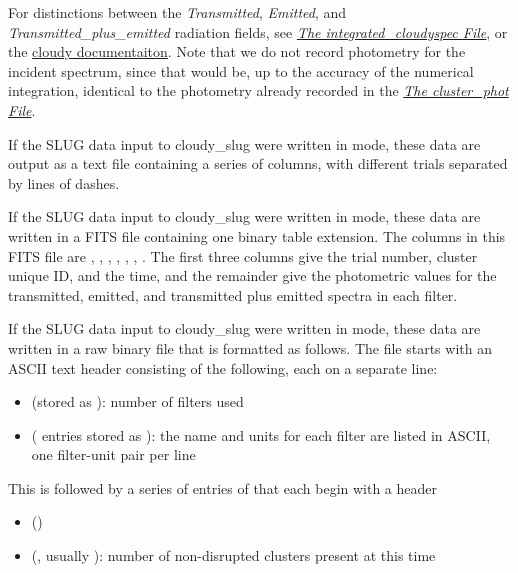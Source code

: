 \documentclass[letterpaper,10pt,english]{sphinxmanual}
\begin{document}
For distinctions between the \emph{Transmitted}, \emph{Emitted}, and
\emph{Transmitted\_plus\_emitted} radiation fields, see
{\hyperref[cloudy:sssec-int-cloudyspec-file]{\emph{The integrated\_cloudyspec File}}}, or the \href{http://nublado.org}{cloudy documentaiton}. Note that we do not record photometry for the
incident spectrum, since that would be, up to the accuracy of the
numerical integration, identical to the photometry already recorded in
the {\hyperref[output:ssec-cluster-phot-file]{\emph{The cluster\_phot File}}}.

If the SLUG data input to cloudy\_slug were written in  mode,
these data are output as a text file containing a series of columns,
with different trials separated by lines of dashes.

If the SLUG data input to cloudy\_slug were written in  mode,
these data are written in a FITS file containing one binary table
extension. The columns in this FITS file are , ,
, , ,
, . The first three columns
give the trial number, cluster unique ID, and the time, and the
remainder give the photometric values for the transmitted, emitted,
and transmitted plus emitted spectra in each filter.

If the SLUG data input to cloudy\_slug were written in  mode,
these data are written in a raw binary file that is formatted as
follows. The file starts with an ASCII text header consisting of the
following, each on a separate line:
\begin{itemize}
\item {} 
 (stored as ): number of filters used

\item {} 
  ( entries stored as ): the name and units for each filter are listed in ASCII, one
filter-unit pair per line

\end{itemize}

This is followed by a series of entries of that each begin with a
header
\begin{itemize}
\item {} 
 ()

\item {} 
 (, usually ): number of non-disrupted clusters present at this time

\end{itemize}
\end{document}
